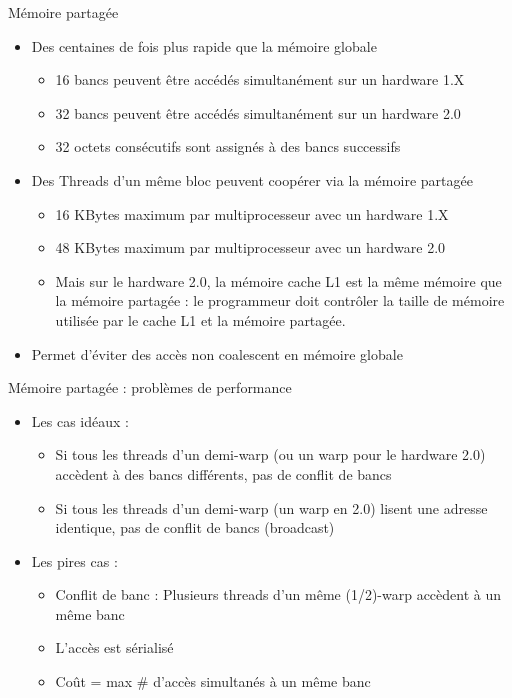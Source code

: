 \documentclass[handout,francais]{beamer}
\begin{document}
\begin{frame}{Mémoire partagée}

\begin{itemize}
\item Des centaines de fois plus rapide que la mémoire globale
  \begin{itemize}
  \item 16 bancs peuvent être accédés simultanément sur
    un hardware 1.X
  \item 32 bancs peuvent être accédés simultanément sur un hardware 2.0
  \item 32 octets consécutifs sont assignés à des bancs successifs
  \end{itemize}
\item Des Threads d'un même bloc peuvent coopérer via la mémoire partagée
  \begin{itemize}
  \item 16 KBytes maximum par multiprocesseur avec un hardware 1.X 
  \item 48 KBytes maximum par multiprocesseur avec un hardware 2.0
  \item Mais sur le hardware 2.0, la mémoire cache L1 est la même mémoire que
    la mémoire partagée : le programmeur doit contrôler la taille de mémoire utilisée
    par le cache L1 et la mémoire partagée.
  \end{itemize}
\item Permet d'éviter des accès non coalescent en mémoire globale  
\end{itemize}
\end{frame}

\begin{frame}{Mémoire partagée : problèmes de performance }

\begin{itemize}
\item Les cas idéaux :
  \begin{itemize}
  \item Si tous les threads d'un demi-warp (ou un warp pour le hardware 2.0)
    accèdent à des bancs différents, pas de conflit de bancs
  \item Si tous les threads d'un demi-warp (un warp en 2.0) lisent une adresse
    identique, pas de conflit de bancs (broadcast)
  \end{itemize}
\item Les pires cas :
  \begin{itemize}
  \item Conflit de banc  : Plusieurs threads d'un même (1/2)-warp accèdent à un même banc
  \item L'accès est sérialisé
  \item Coût = max \# d'accès simultanés à un même banc
  \end{itemize}
\end{itemize}
\end{frame}
\end{document}

